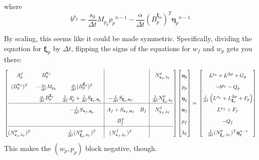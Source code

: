 \documentclass{article}
\newcommand{\mathspace}[1]{\ensuremath{#1}\xspace} %
\newcommand{\dt}{\mathspace{\Delta t}}
\newcommand{\matzero}{}        %
\newcommand{\uf}{\mathspace{\mathbf{u}_f}}
\newcommand{\vf}{\mathspace{\mathbf{v}_f}}
\newcommand{\up}{\mathspace{\mathbf{u}_p}}
\newcommand{\vp}{\mathspace{\mathbf{v}_p}}
\newcommand{\pf}{\mathspace{p_f}}
\newcommand{\pp}{\mathspace{p_p}}
\newcommand{\wf}{\mathspace{w_f}}
\renewcommand{\wp}{\mathspace{w_p}}
\newcommand{\disp}{\mathspace{\boldsymbol{\eta}_p}}
\newcommand{\disptest}{\mathspace{\boldsymbol{\xi}_p}}
\newcommand{\mult}{\mathspace{\lambda_{\Gamma}}}
\newcommand{\multtest}{\mathspace{\mu_{\Gamma}}}
\begin{document}
where
$$b^{\pp} = \frac {s_0}{\dt} M_{\pp} \pp^{n-1} - \frac {\alpha} {\dt} (B_p^{\disptest})^T \disp^{n-1}$$

By scaling, this seems like it could be made symmetric. Specifically, dividing the equation for \disptest by \dt, flipping the signs of the equations for \wf and \wp gets you there:
\[ \renewcommand{\arraystretch}{1.8}
  \left[\begin{array}{@{}ccc|cc|c@{}}
          
          A^d_p & B^{\vp}_p & \matzero & \matzero & \matzero & N^p_{\vp, \mult} \\ %
          (B^{\vp}_p)^T & -\frac {s_0}{\dt} M_{\pp} & \frac{\alpha}{\dt} (B^{\disptest}_p)^T & \matzero & \matzero & \matzero\\ %
          \matzero & \frac {\alpha} {\dt} B^{\disptest}_p & \frac 1 {\dt}A^e_p + \frac 1 {\dt} S_{\disptest, \disp} & -\frac 1 {\dt} S_{\disptest, \uf} & \matzero &\frac 1 {\dt} N^p_{\disptest, \mult}\\ %
          \hline
          \matzero & \matzero & - \frac 1 {\dt} S_{\vf, \disp} & A_f + S_{\vf, \uf} & B_f & N^f_{\vf, \mult}\\ %
          \matzero & \matzero & \matzero & B_f^T & \matzero & \matzero \\ %
          \hline
          (N^p_{\vp, \mult})^T & \matzero & \frac 1 {\dt} (N^p_{\disptest, \mult})^T & (N^f_{\vf, \mult})^T & \matzero & \matzero \\ %

        \end{array}\right]
      \left[\begin{array}{@{}c@{}}
                \up \\
                \pp \\
                \disp \\
                \uf \\
                \pf \\
                \mult
            \end{array}\right]
          = \newline
                      \left[\begin{array}{@{}c@{}}
                L^{\pp} + L^{\Delta p}  + G_p\\
                              -b^{\pp} - Q_p\\
                              \frac 1 {\dt} \left ( L^{\sigma_p} + L_{\disptest}^{\Delta p} + F_p \right )\\
                L^{\sigma_f} + F_f\\
                - Q_f\\
                \frac 1 {\dt} (N^p_{\disptest, \mult})^T \disp^{n-1} \\
        \end{array}\right]
\]
This makes the $(\wp, \pp)$ block negative, though.
\end{document}
